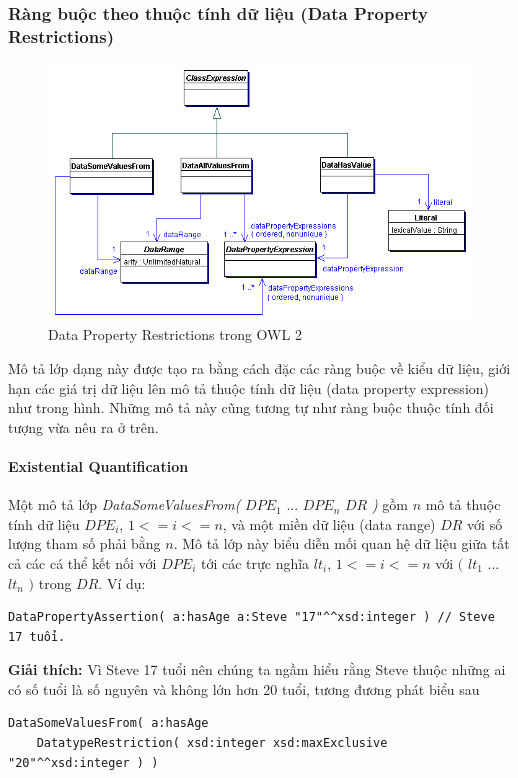 \subsubsection{Ràng buộc theo thuộc tính dữ liệu (Data Property Restrictions)}
\begin{figure}[h]
	\centering
	\includegraphics[width=150mm]{Figures/ce_3.png}
	\caption{Data Property Restrictions trong OWL 2\label{overflow}}
\end{figure}
Mô tả lớp dạng này được tạo ra bằng cách đặc các ràng buộc về kiểu dữ liệu, giới hạn các giá trị dữ liệu lên mô tả thuộc tính dữ liệu (data property expression) như trong hình. Những mô tả này cũng tương tự như ràng buộc thuộc tính đối tượng vừa nêu ra ở trên.


\paragraph{Existential Quantification} Một mô tả lớp \textit{DataSomeValuesFrom(} $DPE_{1}$ ... $DPE_{n}$ $DR$ \textit{)} gồm $n$ mô tả thuộc tính dữ liệu $DPE_{i}$, $1<=i<=n$, và một miền dữ liệu (data range) $DR$ với số lượng tham số phải bằng $n$. Mô tả lớp này biểu diễn mối quan hệ dữ liệu giữa tất cả các cá thể kết nối với $DPE_{i}$ tới các trực nghĩa $lt_{i}$, $1<=i<=n$ với $($ $lt_{1}$ ... $lt_{n}$ $)$ trong $DR$. Ví dụ:
\begin{verbatim}
DataPropertyAssertion( a:hasAge a:Steve "17"^^xsd:integer ) // Steve 17 tuổi.
\end{verbatim}
\textbf{Giải thích:} Vì Steve 17 tuổi nên chúng ta ngầm hiểu rằng Steve thuộc những ai có số tuổi là số nguyên và không lớn hơn 20 tuổi, tương đương phát biểu sau
\begin{verbatim}
DataSomeValuesFrom( a:hasAge 
    DatatypeRestriction( xsd:integer xsd:maxExclusive "20"^^xsd:integer ) )
\end{verbatim}

